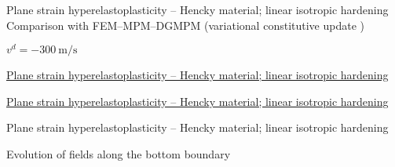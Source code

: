 
\begin{frame}{Plane strain hyperelastoplasticity -- Hencky material; linear isotropic hardening}
  \footnotesize Comparison with FEM--MPM--DGMPM (variational constitutive update \cite{LaurentVariational})
  \centering
  
  \footnotesize $v^d = -300 \: \text{m/s}$
  
\end{frame}

\begin{frame}{\href{section4/animation/hyperelastoplasticity/stress.mp4}{Plane strain hyperelastoplasticity -- Hencky material; linear isotropic hardening}}
  \begin{center}
  \end{center}
\end{frame}


\begin{frame}{\href{section4/animation/hyperelastoplasticity/epeq.mp4}{Plane strain hyperelastoplasticity -- Hencky material; linear isotropic hardening}}
  \begin{center}
  \end{center}
\end{frame}



\begin{frame}{Plane strain hyperelastoplasticity -- Hencky material; linear isotropic hardening}
  \begin{block}{Evolution of fields along the bottom boundary}
    
  \end{block}
  \begin{columns}
    \begin{column}{0.49\textwidth}
      
    \end{column}
    \begin{column}{0.49\textwidth}
      
    \end{column}
  \end{columns}
\end{frame}

